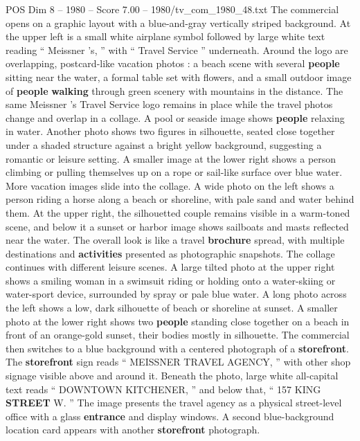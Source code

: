 \begin{textsample}{POS Dim 8 – 1980 – Score 7.00 – 1980/tv\_com\_1980\_48.txt}  \label{ex:f8_pos_045}
The commercial opens on a graphic layout with a blue-and-gray vertically striped background.
At the upper left is a small white airplane symbol followed by large white text reading “ Meissner ’s, ” with “ Travel Service ” underneath.
Around the logo are overlapping, postcard-like vacation photos : a beach scene with several \textbf{people} sitting near the water, a formal table set with flowers, and a small outdoor image of \textbf{people} \textbf{walking} through green scenery with mountains in the distance.
The same Meissner ’s Travel Service logo remains in place while the travel photos change and overlap in a collage.
A pool or seaside image shows \textbf{people} relaxing in water.
Another photo shows two figures in silhouette, seated close together under a shaded structure against a bright yellow background, suggesting a romantic or leisure setting.
A smaller image at the lower right shows a person climbing or pulling themselves up on a rope or sail-like surface over blue water.
More vacation images slide into the collage.
A wide photo on the left shows a person riding a horse along a beach or shoreline, with pale sand and water behind them.
At the upper right, the silhouetted couple remains visible in a warm-toned scene, and below it a sunset or harbor image shows sailboats and masts reflected near the water.
The overall look is like a travel \textbf{brochure} spread, with multiple destinations and \textbf{activities} presented as photographic snapshots.
The collage continues with different leisure scenes.
A large tilted photo at the upper right shows a smiling woman in a swimsuit riding or holding onto a water-skiing or water-sport device, surrounded by spray or pale blue water.
A long photo across the left shows a low, dark silhouette of beach or shoreline at sunset.
A smaller photo at the lower right shows two \textbf{people} standing close together on a beach in front of an orange-gold sunset, their bodies mostly in silhouette.
The commercial then switches to a blue background with a centered photograph of a \textbf{storefront}.
The \textbf{storefront} sign reads “ MEISSNER TRAVEL AGENCY, ” with other shop signage visible above and around it.
Beneath the photo, large white all-capital text reads “ DOWNTOWN KITCHENER, ” and below that, “ 157 KING \textbf{STREET} W. ” The image presents the travel agency as a physical street-level office with a glass \textbf{entrance} and display windows.
A second blue-background location card appears with another \textbf{storefront} photograph.

\end{textsample}
